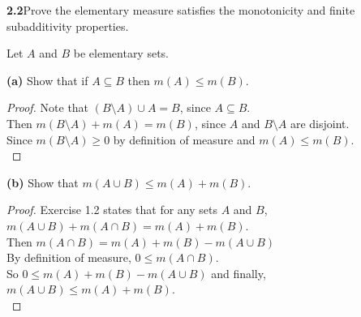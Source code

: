 \documentclass[12pt]{article}
\begin{document}
\hspace{-4 ex}\textbf{2.2}Prove the elementary measure satisfies the monotonicity and finite subadditivity properties. \bigbreak

Let $A$ and $B$ be elementary sets. \bigbreak

\hspace{-4 ex}\textbf{(a)} Show that if $A \subseteq B$ then $m(A) \leq m(B)$. \bigbreak

\begin{proof}
	Note that $(B \setminus A) \cup A = B$, since $A \subseteq B$. \\
	Then $m(B \setminus A) + m(A) = m(B)$, since $A$ and $B \setminus A$ are disjoint. \\
	Since $m(B\setminus A) \geq 0$ by definition of measure and $m(A) \leq m(B)$.\\	
\end{proof}

\hspace{-4 ex}\textbf{(b)} Show that $m(A \cup B) \leq m(A) + m(B)$. \bigbreak

\begin{proof}
	Exercise 1.2 states that for any sets $A$ and $B$, \\ $m(A\cup B)+m(A\cap B)=m(A)+m(B)$. \\
	Then $m(A\cap B) = m(A) + m(B) - m(A\cup B)$ \\
	By definition of measure, $0 \leq m(A \cap B)$. \\
	So $0 \leq m(A) + m(B) - m(A\cup B)$ and finally, $m(A\cup B) \leq m(A)+m(B)$. \\
\end{proof}
\end{document}
